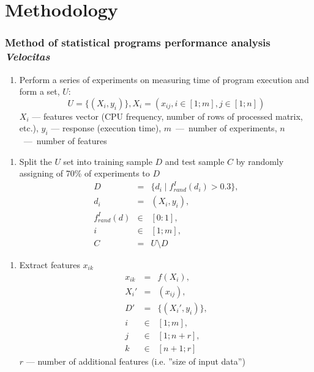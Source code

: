 \documentclass{beamer}
\newcounter{saveenumi}
\newcommand{\seti}{\setcounter{saveenumi}{\value{enumi}}}
\newcommand{\conti}{\setcounter{enumi}{\value{saveenumi}}}
\begin{document}
\section{Methodology}

\begin{frame}
\frametitle{Method of statistical programs performance analysis \textit{Velocitas}}

	\begin{enumerate}
		\item Perform a series of experiments on measuring time of program execution and form a set, $U$:
			\begin{equation*}
				U = \{ ( X_i, y_i ) \}, X_i = (x_{ij}, i \in [1;m], j \in [1;n])
			\end{equation*}
		$X_i$ --- features vector (CPU frequency, number of rows of processed matrix, etc.), $y_i$ --- response (execution time), $m$~---~number of experiments, $n$~---~number of features
		\seti
	\end{enumerate}

\end{frame}

\begin{frame}
	\begin{enumerate}
		\conti
		\item Split the $U$ set into training sample $D$ and test sample $C$ by randomly assigning of 70\% of experiments to $D$
			\begin{eqnarray}
				D &=& \{d_i \mid f_{rand}^I(d_i) > 0.3\}, \\
				d_i &=& (X_i, y_i), \\
				f_{rand}^I(d) &\in & [0:1], \\
				i &\in & [1;m], \\
				C &=& U \setminus D
			\end{eqnarray}
		\seti
	\end{enumerate}
\end{frame}


\begin{frame}
	\begin{enumerate}
		\conti
		\item Extract features $x_{ik}$
			\begin{eqnarray}
				x_{ik} &=& f(X_i), \\
				X_i' &=& (x_{ij}) , \\
				D' &=& \{ (X_i' , y_i) \}, \\
				i &\in & [1;m], \\
				j &\in & [1;n+r], \\
				k &\in & [n+1;r]
			\end{eqnarray}
			$r$ --- number of additional features (i.e. ''size of input data'')
		\seti
	\end{enumerate}
\end{frame}
\end{document}
